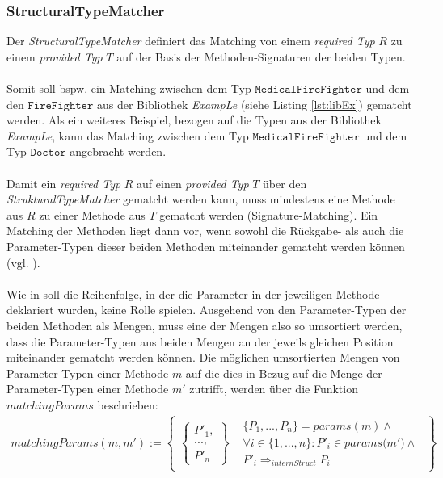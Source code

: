 \subsubsection{StructuralTypeMatcher} \label{subsec_structmatcher}
Der \emph{StructuralTypeMatcher} definiert das Matching von einem \emph{required Typ} $R$ zu einem \emph{provided Typ} $T$ auf der Basis der Methoden-Signaturen der beiden Typen.
\\\\
Somit soll bspw. ein Matching zwischen dem Typ $\texttt{MedicalFireFighter}$ und dem den $\texttt{FireFighter}$ aus der Bibliothek \emph{ExampLe}  (siehe Listing \ref{lst:libEx}) gematcht werden. Als ein weiteres Beispiel, bezogen auf die Typen aus der Bibliothek \emph{ExampLe}, kann das Matching zwischen dem Typ $\texttt{MedicalFireFighter}$ und dem Typ $\texttt{Doctor}$ angebracht werden.
\\\\
Damit ein \emph{required Typ} $R$ auf einen \emph{provided Typ} $T$ über den \emph{StrukturalTypeMatcher} gematcht werden kann, muss mindestens eine Methode aus $R$ zu einer Methode aus $T$ gematcht werden (Signature-Matching). Ein Matching der Methoden liegt dann vor, wenn sowohl die Rückgabe- als auch die Parameter-Typen dieser beiden Methoden miteinander gematcht werden können (vgl. \cite{moormann}). 
\\\\
Wie in \cite{moormann} soll die Reihenfolge, in der die Parameter in der jeweiligen Methode deklariert wurden, keine Rolle spielen. Ausgehend von den Parameter-Typen der beiden Methoden als Mengen, muss eine der Mengen also so umsortiert werden, dass die Parameter-Typen aus beiden Mengen an der jeweils gleichen Position miteinander gematcht werden können.
Die möglichen umsortierten Mengen von Parameter-Typen einer Methode $m$ auf die dies in Bezug auf die Menge der Parameter-Typen einer Methode $m'$ zutrifft, werden über die Funktion $\mathit{matchingParams}$ beschrieben:
\begin{gather*}
\mathit{matchingParams(m, m')} :=
\left\{
\begin{array}{l|l}
	\left\{
	\begin{array}{l}
		 \mathit{P'_1},\\
		 \mathit{...,} \\
		 \mathit{P'_n}
	\end{array}
	\right\}
	&
	\begin{array}{l}
		\{\mathit{P_1,...,P_n}\} = \mathit{params(m)} 				\wedge \mathit{ }
		\\
		\forall i \in \{1,...,n\}: \mathit{P'_i} \in 				\mathit{params(m'}) \wedge \mathit{ }
		\\	
		\mathit{P'_i} \Rightarrow_{internStruct} 					\mathit{P_i}
	\end{array}
\end{array}
\right\}
\end{gather*}
